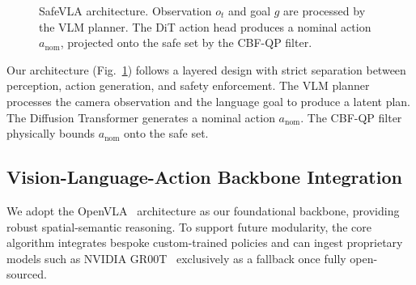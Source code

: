 \documentclass[conference]{IEEEtran}
\begin{document}
\begin{figure}[t]
\centering
{}
\caption{SafeVLA architecture. Observation $o_t$ and goal $g$ are processed by the VLM planner. The DiT action head produces a nominal action $a_\text{nom}$, projected onto the safe set by the CBF-QP filter.}
\label{fig:arch}
\end{figure}

Our architecture (Fig.~\ref{fig:arch}) follows a layered design with strict separation between perception, action generation, and safety enforcement. The VLM planner processes the camera observation and the language goal to produce a latent plan. The Diffusion Transformer generates a nominal action $a_\text{nom}$. The CBF-QP filter physically bounds $a_\text{nom}$ onto the safe set.

\subsection{Vision-Language-Action Backbone Integration}
We adopt the OpenVLA~\cite{openvla2024} architecture as our foundational backbone, providing robust spatial-semantic reasoning. To support future modularity, the core algorithm integrates bespoke custom-trained policies and can ingest proprietary models such as NVIDIA GR00T~\cite{groot2025} exclusively as a fallback once fully open-sourced.
\end{document}
